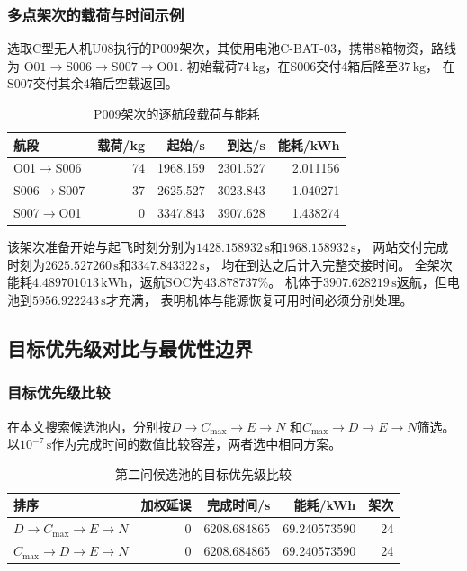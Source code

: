 \documentclass[bwprint]{gmcmthesis}
\begin{document}
\subsubsection{多点架次的载荷与时间示例}
选取C型无人机U08执行的P009架次，其使用电池C-BAT-03，携带8箱物资，路线为
\(\mathrm{O01}\rightarrow\mathrm{S006}\rightarrow\mathrm{S007}\rightarrow\mathrm{O01}\).
初始载荷$74\,\mathrm{kg}$，在S006交付4箱后降至$37\,\mathrm{kg}$，
在S007交付其余4箱后空载返回。
\begin{table}[htbp]
\centering
\small
\caption{P009架次的逐航段载荷与能耗}
\label{tab:q2_multistop}
\begin{tabular}{lrrrr}
\toprule
航段 & 载荷/kg & 起始/s & 到达/s & 能耗/kWh \\
\midrule
O01$\rightarrow$S006 & 74 & 1968.159 & 2301.527 & 2.011156 \\
S006$\rightarrow$S007 & 37 & 2625.527 & 3023.843 & 1.040271 \\
S007$\rightarrow$O01 & 0 & 3347.843 & 3907.628 & 1.438274 \\
\bottomrule
\end{tabular}
\end{table}

该架次准备开始与起飞时刻分别为$1428.158932\,\mathrm{s}$和$1968.158932\,\mathrm{s}$，
两站交付完成时刻为$2625.527260\,\mathrm{s}$和$3347.843322\,\mathrm{s}$，
均在到达之后计入完整交接时间。
全架次能耗$4.489701013\,\mathrm{kWh}$，返航SOC为$43.878737\%$。
机体于$3907.628219\,\mathrm{s}$返航，但电池到$5956.922243\,\mathrm{s}$才充满，
表明机体与能源恢复可用时间必须分别处理。

\subsection{目标优先级对比与最优性边界}
\subsubsection{目标优先级比较}
在本文搜索候选池内，分别按$D\rightarrow C_{\max}\rightarrow E\rightarrow N$
和$C_{\max}\rightarrow D\rightarrow E\rightarrow N$筛选。
以$10^{-7}\,\mathrm{s}$作为完成时间的数值比较容差，两者选中相同方案。
\begin{table}[htbp]
\centering
\small
\caption{第二问候选池的目标优先级比较}
\label{tab:q2_priority}
\begin{tabular}{lrrrr}
\toprule
排序 & 加权延误 & 完成时间/s & 能耗/kWh & 架次 \\
\midrule
$D\to C_{\max}\to E\to N$ & 0 & 6208.684865 & 69.240573590 & 24 \\
$C_{\max}\to D\to E\to N$ & 0 & 6208.684865 & 69.240573590 & 24 \\
\bottomrule
\end{tabular}
\end{table}
\end{document}
